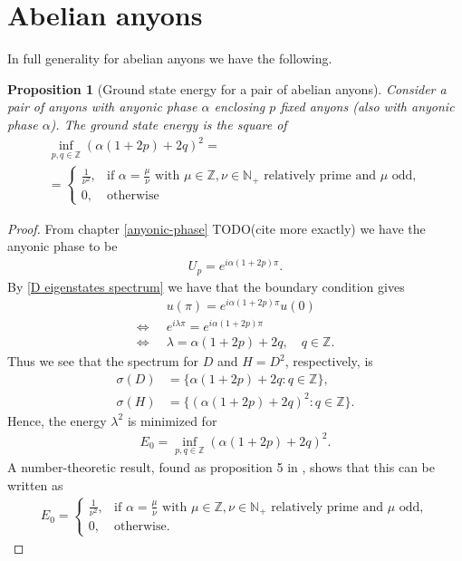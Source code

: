 \documentclass[a4paper,10pt,oneside]{book}
\theoremstyle{plain}
\newtheorem{proposition}[theorem]{Proposition}
\theoremstyle{definition}
\theoremstyle{remark}
\begin{document}
{\section{Abelian anyons}


In full generality for abelian anyons we have the following.

\begin{proposition}[Ground state energy for a pair of abelian anyons]
  Consider a pair of anyons with anyonic phase $\alpha$ enclosing $p$ fixed anyons (also with anyonic phase $\alpha$).
  The ground state energy is the square of
    \begin{gather*}
      \inf_{p,q\in\mathbb{Z}} \left(\alpha(1+2p)+2q\right)^2 =\\
      = \begin{cases}
        \frac{1}{\nu^2}, & \text{if $\alpha = \frac{\mu}{\nu}$ with $\mu \in \mathbb{Z}, \nu \in \mathbb{N}_+$ relatively prime and $\mu$ odd}, \\
        0, & \text{otherwise}
      \end{cases}
    \end{gather*}
\end{proposition}

\begin{proof}
  From chapter \cref{anyonic-phase} TODO(cite more exactly) we have the anyonic phase to be
  \begin{align*}
    U_p = e^{i\alpha(1+2p)\pi}.
  \end{align*}
  By \cref{D eigenstates spectrum} we have that the boundary condition gives
  \begin{align*}
    &u(\pi) = e^{i\alpha(1+2p)\pi} u(0) \\
    \iff\;\; &e^{i\lambda \pi} = e^{i\alpha(1+2p)\pi} \\
    \iff\;\; &\lambda = \alpha(1+2p) + 2q, \quad q \in \mathbb{Z}.
  \end{align*}
  Thus we see that the spectrum for $D$ and $H = D^2$, respectively, is
  \begin{align*}
    \sigma(D) &= \{ \alpha(1+2p) + 2q : q \in \mathbb{Z}\}, \\
    \sigma(H) &= \{ (\alpha(1+2p) + 2q)^2 : q \in \mathbb{Z}\}.
  \end{align*}
  Hence, the energy $\lambda^2$ is minimized for
  \begin{align*}
    E_0 = \inf_{p,q\in\mathbb{Z}} (\alpha(1+2p)+2q)^2.
  \end{align*}
  A number-theoretic result, found as proposition 5 in \cite{lundholm-solovej}, shows that this can be written as
  \begin{align*}
    E_0 =
    \begin{cases}
      \frac{1}{\nu^2}, & \text{if $\alpha = \frac{\mu}{\nu}$ with $\mu \in \mathbb{Z}, \nu \in \mathbb{N}_+$ relatively prime and $\mu$ odd}, \\
      0, & \text{otherwise}.
    \end{cases}
  \end{align*}
\end{proof}

}
\end{document}
